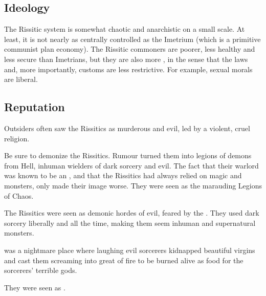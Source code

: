 \subsection{Ideology}
The Rissitic system is somewhat chaotic and anarchistic on a small scale. 
At least, it is not nearly as centrally controlled as the Imetrium (which is a primitive communist plan economy). 
The Rissitic commoners are poorer, less healthy and less secure than Imetrians, but they are also more , in the sense that the laws and, more importantly, customs are less restrictive. 
For example, sexual morals are liberal. 





\subsection{Reputation}
Outsiders often saw the Rissitics as murderous and evil, led by a violent, cruel religion. 


Be sure to demonize the Rissitics. 
Rumour turned them into legions of demons from Hell, inhuman wielders of dark sorcery and evil.
The fact that their warlord \Narkiza was known to be an \Ashenoch, and that the Rissitics had always relied on magic and monsters, only made their image worse.
They were seen as the marauding Legions of Chaos.

The Rissitics were seen as demonic hordes of evil, feared by the \Velcadians.
They used dark sorcery liberally and all the time, making them seem inhuman and supernatural monsters.

\Durcac was a nightmare place where laughing evil sorcerers kidnapped beautiful virgins and cast them screaming into great  of fire to be burned alive as food for the sorcerers' terrible gods. 

They were seen as .






